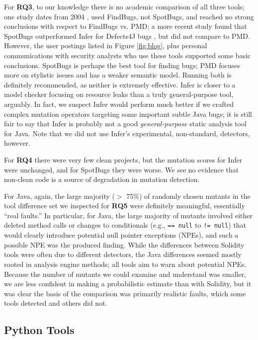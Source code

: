 For {\bf RQ3}, to our knowledge there is no academic comparison of all three tools; one study dates from 2004 \cite{CompareJavaTools}, used FindBugs, not SpotBugs, and reached no strong conclusions with respect to FindBugs vs. PMD; a more recent study found that SpotBugs outperformed Infer for Defects4J \cite{just2014defects4j} bugs \cite{AllBugs}, but did not compare to PMD.  However, the user postings listed in Figure \ref{fig:blog}, plus personal communications with security analysts who use these tools \cite{personalJava} supported some basic conclusions.  SpotBugs is perhaps the best tool for finding bugs; PMD focuses more on stylistic issues and has a weaker semantic model.  Running both is definitely recommended, as neither is extremely effective.  Infer is closer to a model checker focusing on resource leaks than a truly general-purpose tool, arguably.  In fact, we suspect Infer would perform much better if we crafted complex mutation operators targeting some important subtle Java bugs; it is still fair to say that Infer is probably not a good \emph{general-purpose} static analysis tool for Java.  Note that we did not use Infer's experimental, non-standard, detectors, however.

For {\bf RQ4} there were very few clean projects, but the mutation scores for Infer were unchanged, and for SpotBugs they were worse.  We see no evidence that non-clean code is a source of degradation in mutation detection.

For Java, again, the large majority ($>$ 75\%) of randomly chosen mutants in the tool difference set we inspected for {\bf RQ5} were definitely meaningful, essentially ``real faults.''  In particular, for Java, the large majority of mutants involved either deleted method calls or changes to conditionals (e.g., {\tt == null} to {\tt != null}) that would clearly introduce potential null pointer exceptions (NPEs), and such a possible NPE was the produced finding.  While the differences between Solidity tools were often due to different detectors, the Java differences seemed mostly rooted in analysis engine methods; all tools aim to warn about potential NPEs.  Because the number of mutants we could examine and understand was smaller, we are less confident in making a probabilistic estimate than with Solidity, but it was clear the basis of the comparison was primarily realistic faults, which some tools detected and others did not.

\subsection{Python Tools}

